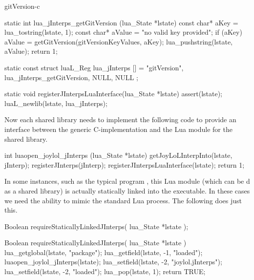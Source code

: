 \stopTestCase
\stopTestSuite

\component gitVersion-c

\startCCode
static int lua_jInterps_getGitVersion (lua_State *lstate) {
  const char* aKey   = lua_tostring(lstate, 1);
  const char* aValue = "no valid key provided";
  if (aKey) aValue = getGitVersion(gitVersionKeyValues, aKey);
  lua_pushstring(lstate, aValue);
  return 1;
}
\stopCCode

\startCCode
static const struct luaL_Reg lua_jInterps [] = {
  {"gitVersion", lua_jInterps_getGitVersion},
  {NULL, NULL}
};
\stopCCode

\startCCode
static void registerJInterpsLuaInterface(lua_State *lstate) {
  assert(lstate);
  luaL_newlib(lstate, lua_jInterps);
}
\stopCCode

Now each shared library needs to implement the following code to provide 
an interface between the generic C-implementation and the Lua module for 
the shared library. 

\startCCode
int luaopen_joylol_jInterps (lua_State *lstate) {
  getJoyLoLInterpInto(lstate, jInterp);
  registerJInterps(jInterp);
  registerJInterpsLuaInterface(lstate);
  return 1;
}
\stopCCode

In some instances, such as the typical  program 
, this Lua module (which can be d as a 
shared library) is actually statically linked into the executable. In 
these cases we need the ability to mimic the standard Lua  
process. The following  does just this. 

\startCHeader
Boolean requireStaticallyLinkedJInterps(
  lua_State *lstate
);
\stopCHeader

\startCCode
Boolean requireStaticallyLinkedJInterps(
  lua_State *lstate
) {
  lua_getglobal(lstate, "package");
  lua_getfield(lstate, -1, "loaded");
  luaopen_joylol_jInterps(lstate);
  lua_setfield(lstate, -2, "joylol.jInterps");
  lua_setfield(lstate, -2, "loaded");
  lua_pop(lstate, 1);
  return TRUE;
}
\stopCCode
